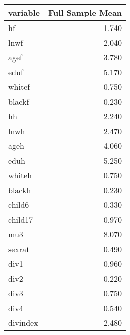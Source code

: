 \begin{tabular}{lr}
  \hline
variable & Full Sample Mean \\ 
  \hline
hf & 1.740 \\ 
  lnwf & 2.040 \\ 
  agef & 3.780 \\ 
  eduf & 5.170 \\ 
  whitef & 0.750 \\ 
  blackf & 0.230 \\ 
  hh & 2.240 \\ 
  lnwh & 2.470 \\ 
  ageh & 4.060 \\ 
  eduh & 5.250 \\ 
  whiteh & 0.750 \\ 
  blackh & 0.230 \\ 
  child6 & 0.330 \\ 
  child17 & 0.970 \\ 
  mu3 & 8.070 \\ 
  sexrat & 0.490 \\ 
  div1 & 0.960 \\ 
  div2 & 0.220 \\ 
  div3 & 0.750 \\ 
  div4 & 0.540 \\ 
  divindex & 2.480 \\ 
   \hline
\end{tabular}
